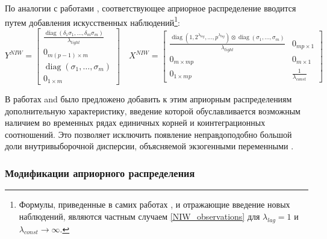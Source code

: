 \documentclass[11pt]{article} %
\DeclareMathOperator{\diag}{diag}
\begin{document}
По аналогии с  работами  \cite{banbura_al_2010_large}, \cite{berg_henzel_2013_point} соответствующее априорное распределение вводится путем добавления искусственных наблюдений\footnote{Формулы, приведенные в самих работах \cite{banbura_al_2010_large}, \cite{berg_henzel_2013_point} и отражающие введение новых наблюдений, являются частным случаем \eqref{NIW_observations} для $\lambda_{lag}=1$ и $\lambda_{const}\to\infty$.}:
\begin{equation}
Y^{NIW}=\begin{bmatrix}
\frac{\diag(\delta_1\sigma_1,\ldots, \delta_m\sigma_m)}{\lambda_{tight}}\\
0_{m(p-1)\times m}\\
\diag(\sigma_1,\ldots,\sigma_m)\\
0_{1\times m}
\end{bmatrix}
\quad
%
X^{NIW}=\begin{bmatrix}
\frac{\diag(1,2^{\lambda_{lag}},\ldots, p^{\lambda_{lag}})\otimes \diag(\sigma_1,\ldots,\sigma_m)}{\lambda_{tight}} & 0_{mp\times 1} \\
0_{m\times mp}&0_{m\times 1}\\
0_{1\times mp}&\frac{1}{\lambda_{const}}
\end{bmatrix}\label{NIW_observations}
\end{equation}





В работах \cite{doan_litterman_sims_1984_forecasting} and \cite{sims_1993_nine} было предложено добавить к этим априорным распределениям дополнительную характеристику, введение которой обуславливается возможным наличием во временных рядах единичных корней и коинтеграционных  соотношений. Это позволяет исключить появление неправдоподобно большой доли внутривыборочной дисперсии, объясняемой экзогенными переменными \cite{carriero_al_2015_bayesian}. %



\subsubsection*{Модификации априорного распределения}
\end{document}
